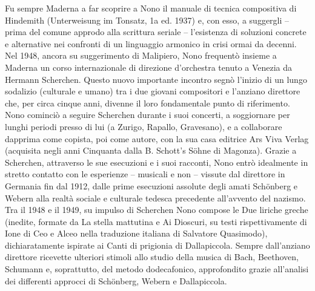 Fu sempre Maderna a far scoprire a Nono il manuale di tecnica compositiva di Hindemith (Unterweisung im Tonsatz, 1a ed. 1937) e, con esso, a suggergli – prima del comune approdo alla scrittura seriale – l’esistenza di soluzioni concrete e alternative nei confronti di un linguaggio armonico in crisi ormai da decenni. Nel 1948, ancora su suggerimento di Malipiero, Nono frequentò insieme a Maderna un corso internazionale di direzione d’orchestra tenuto a Venezia da Hermann Scherchen. Questo nuovo importante incontro segnò l’inizio di un lungo sodalizio (culturale e umano) tra i due giovani compositori e l’anziano direttore che, per circa cinque anni, divenne il loro fondamentale punto di riferimento. Nono cominciò a seguire Scherchen durante i suoi concerti, a soggiornare per lunghi periodi presso di lui (a Zurigo, Rapallo, Gravesano), e a collaborare dapprima come copista, poi come autore, con la sua casa editrice Ars Viva Verlag (acquisita negli anni Cinquanta dalla B. Schott’s Söhne di Magonza). Grazie a Scherchen, attraverso le sue esecuzioni e i suoi racconti, Nono entrò idealmente in stretto contatto con le esperienze – musicali e non – vissute dal direttore in Germania fin dal 1912, dalle prime esecuzioni assolute degli amati Schönberg e Webern alla realtà sociale e culturale tedesca precedente all’avvento del nazismo. Tra il 1948 e il 1949, su impulso di Scherchen Nono compose le Due liriche greche (inedite, formate da La stella mattutina e Ai Dioscuri, su testi rispettivamente di Ione di Ceo e Alceo nella traduzione italiana di Salvatore Quasimodo), dichiaratamente ispirate ai Canti di prigionia di Dallapiccola. Sempre dall’anziano direttore ricevette ulteriori stimoli allo studio della musica di Bach, Beethoven, Schumann e, soprattutto, del metodo dodecafonico, approfondito grazie all’analisi dei differenti approcci di Schönberg, Webern e Dallapiccola.

